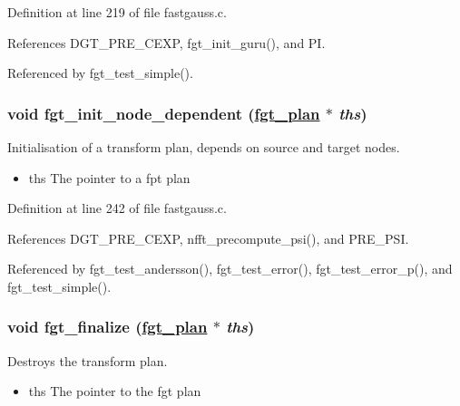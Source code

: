 Definition at line 219 of file fastgauss.c.

References DGT\_\-PRE\_\-CEXP, fgt\_\-init\_\-guru(), and PI.

Referenced by fgt\_\-test\_\-simple().\hypertarget{group__applications__fastgauss_ga4}{
\subsubsection[fgt\_\-init\_\-node\_\-dependent]{\setlength{\rightskip}{0pt plus 5cm}void fgt\_\-init\_\-node\_\-dependent (\hyperlink{structfgt__plan}{fgt\_\-plan} $\ast$ {\em ths})}}
\label{group__applications__fastgauss_ga4}


Initialisation of a transform plan, depends on source and target nodes. 

\begin{itemize}
\item ths The pointer to a fpt plan 
\end{itemize}


Definition at line 242 of file fastgauss.c.

References DGT\_\-PRE\_\-CEXP, nfft\_\-precompute\_\-psi(), and PRE\_\-PSI.

Referenced by fgt\_\-test\_\-andersson(), fgt\_\-test\_\-error(), fgt\_\-test\_\-error\_\-p(), and fgt\_\-test\_\-simple().\hypertarget{group__applications__fastgauss_ga5}{
\subsubsection[fgt\_\-finalize]{\setlength{\rightskip}{0pt plus 5cm}void fgt\_\-finalize (\hyperlink{structfgt__plan}{fgt\_\-plan} $\ast$ {\em ths})}}
\label{group__applications__fastgauss_ga5}


Destroys the transform plan. 

\begin{itemize}
\item ths The pointer to the fgt plan 
\end{itemize}


